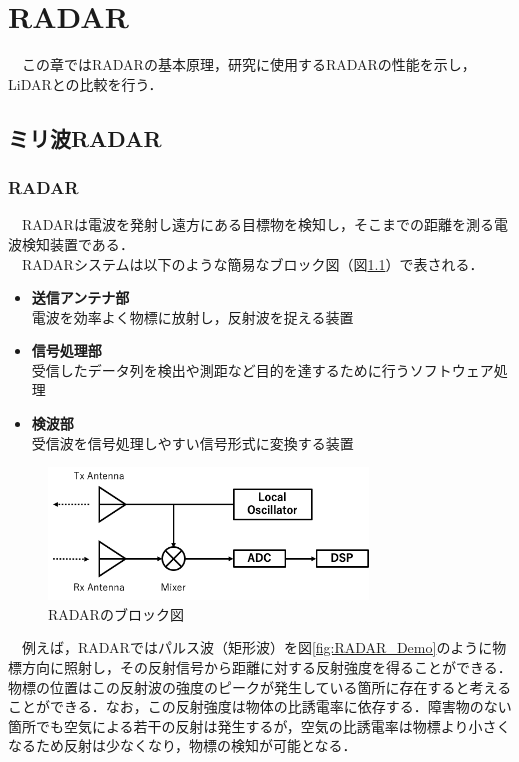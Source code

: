 \chapter{RADAR}
　この章ではRADARの基本原理，研究に使用するRADARの性能を示し，LiDARとの比較を行う．

\section{ミリ波RADAR}
\subsection{RADAR}
　RADARは電波を発射し遠方にある目標物を検知し，そこまでの距離を測る電波検知装置である\cite{RADAR_book}．\\
　RADARシステムは以下のような簡易なブロック図（図\ref{fig:RADAR_Block}）で表される．

\begin{itemize}
    \item \textbf{送信アンテナ部}\\
        電波を効率よく物標に放射し，反射波を捉える装置
    \item \textbf{信号処理部}\\
        受信したデータ列を検出や測距など目的を達するために行うソフトウェア処理
    \item \textbf{検波部}\\
        受信波を信号処理しやすい信号形式に変換する装置
\end{itemize}

\begin{figure}[H]
    \centering
    \includegraphics[width=8.5cm]{./fig/RADAR_Block.png}
    \caption{RADARのブロック図}
    \label{fig:RADAR_Block}
\end{figure}

　例えば，RADARではパルス波（矩形波）を図\ref{fig:RADAR_Demo}のように物標方向に照射し，その反射信号から距離に対する反射強度を得ることができる．物標の位置はこの反射波の強度のピークが発生している箇所に存在すると考えることができる．なお，この反射強度は物体の比誘電率に依存する．障害物のない箇所でも空気による若干の反射は発生するが，空気の比誘電率は物標より小さくなるため反射は少なくなり，物標の検知が可能となる．

